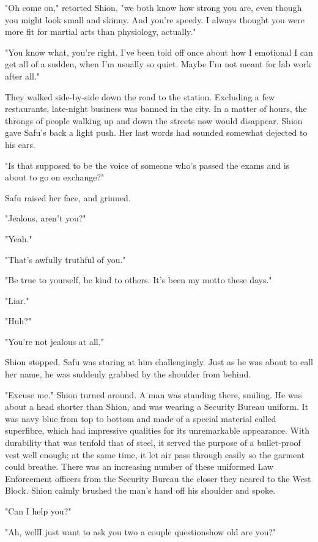 "Oh come on," retorted Shion, "we both know how strong you are, even
though you might look small and skinny. And you're speedy. I always
thought you were more fit for martial arts than physiology, actually."

"You know what, you're right. I've been told off once about how I
emotional I can get all of a sudden, when I'm usually so quiet. Maybe
I'm not meant for lab work after all."

They walked side-by-side down the road to the station. Excluding a few
restaurants, late-night business was banned in the city. In a matter of
hours, the throngs of people walking up and down the streets now would
disappear. Shion gave Safu's back a light push. Her last words had
sounded somewhat dejected to his ears.

"Is that supposed to be the voice of someone who's passed the exams and
is about to go on exchange?"

Safu raised her face, and grinned.

"Jealous, aren't you?"

"Yeah."

"That's awfully truthful of you."

"Be true to yourself, be kind to others. It's been my motto these days."

"Liar."

"Huh?"

"You're not jealous at all."

Shion stopped. Safu was staring at him challengingly. Just as he was
about to call her name, he was suddenly grabbed by the shoulder from
behind.

"Excuse me." Shion turned around. A man was standing there, smiling. He
was about a head shorter than Shion, and was wearing a Security Bureau
uniform. It was navy blue from top to bottom and made of a special
material called superfibre, which had impressive qualities for its
unremarkable appearance. With durability that was tenfold that of steel,
it served the purpose of a bullet-proof vest well enough; at the same
time, it let air pass through easily so the garment could breathe. There
was an increasing number of these uniformed Law Enforcement officers
from the Security Bureau the closer they neared to the West Block. Shion
calmly brushed the man's hand off his shoulder and spoke.

"Can I help you?"

"Ah, well\el I just want to ask you two a couple questions\el how old
are you?"


